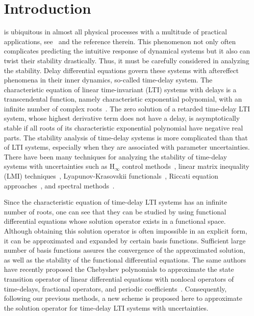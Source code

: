 \documentclass[journal]{IEEEtran}
\begin{document}
\section{Introduction}
 is ubiquitous in almost all physical processes with a multitude of practical applications, see~\cite{Gu2003stability,Richard2003time} and the reference therein. This phenomenon not only often complicates predicting the intuitive response of dynamical systems but it also can twist their stability drastically. Thus, it must be carefully considered in analyzing the stability. Delay differential equations govern these systems with aftereffect phenomena in their inner dynamics, so-called time-delay system. The characteristic equation of linear time-invariant (LTI) systems with delays is a transcendental function, namely characteristic exponential polynomial, with an infinite number of complex roots~\cite{Richard2003time,Gu2003stability}. The zero solution of a retarded time-delay LTI system, whose highest derivative term does not have a delay, is asymptotically stable if all roots of its characteristic exponential polynomial have negative real parts. The stability analysis of time-delay systems is more complicated than that of LTI systems, especially when they are associated with parameter uncertainties. There have been many techniques for analyzing the stability of time-delay systems with uncertainties such as H$_ \infty $ control methods~\cite{Ge1996robust}, linear matrix inequality (LMI) techniques~\cite{Li1997criteria,Yu1999technical}, Lyapunov-Krasovskii functionals~\cite{He2004parameter,Sun2009delay}, Riccati equation approaches~\cite{Shen1991memoryless}, and spectral methods~\cite{Dabiri2017FPTD,Butcher2004stability}.


Since the characteristic equation of time-delay LTI systems has an infinite number of roots, one can see that they can be studied by using functional differential equations whose solution operator exists in a functional space. Although obtaining this solution operator is often impossible in an explicit form, it can be approximated and expanded by certain basis functions. Sufficient large number of basis functions assures the convergence of the approximated solution, as well as the stability of the functional differential equations. The same authors have recently proposed the Chebyshev polynomials to approximate the state transition operator of linear differential equations with nonlocal operators of time-delays, fractional operators, and periodic coefficients~\cite{Dabiri2017FPTD,Dabiri2016EfficientFCDMs,Dabiri2017MFDDEs,Dabiri2017RECCA}. Consequently, following our previous methods, a new scheme is proposed here to approximate the solution operator for time-delay LTI systems with uncertainties.
\end{document}
